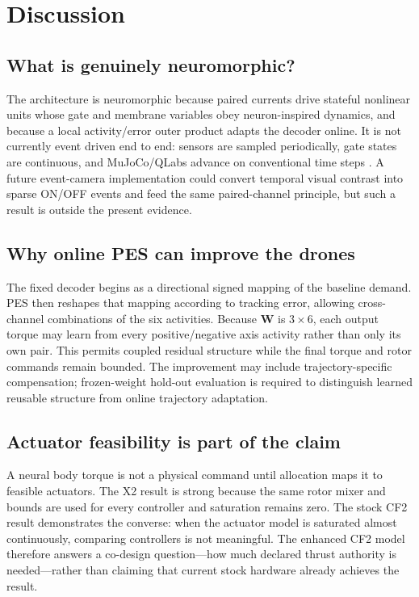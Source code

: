 \documentclass[10pt,twocolumn]{article}
\begin{document}
\section{Discussion}

\subsection{What is genuinely neuromorphic?}

The architecture is neuromorphic because paired currents drive stateful
nonlinear units whose gate and membrane variables obey neuron-inspired dynamics,
and because a local activity/error outer product adapts the decoder online. It
is not currently event driven end to end: sensors are sampled periodically,
gate states are continuous, and MuJoCo/QLabs advance on conventional time
steps \cite{pedersen2024nir,nourse2023sns}. A future event-camera implementation could convert temporal visual
contrast into sparse ON/OFF events and feed the same paired-channel principle,
but such a result is outside the present evidence.

\subsection{Why online PES can improve the drones}

The fixed decoder begins as a directional signed mapping of the baseline
demand. PES then reshapes that mapping according to tracking error, allowing
cross-channel combinations of the six activities. Because $\bm W$ is
$3\times6$, each output torque may learn from every positive/negative axis
activity rather than only its own pair. This permits coupled residual structure
while the final torque and rotor commands remain bounded. The improvement may
include trajectory-specific compensation; frozen-weight hold-out evaluation is
required to distinguish learned reusable structure from online trajectory
adaptation.

\subsection{Actuator feasibility is part of the claim}

A neural body torque is not a physical command until allocation maps it to
feasible actuators. The X2 result is strong because the same rotor mixer and
bounds are used for every controller and saturation remains zero. The stock CF2
result demonstrates the converse: when the actuator model is saturated almost
continuously, comparing controllers is not meaningful. The enhanced CF2 model
therefore answers a co-design question---how much declared thrust authority is
needed---rather than claiming that current stock hardware already achieves the
result.
\end{document}
